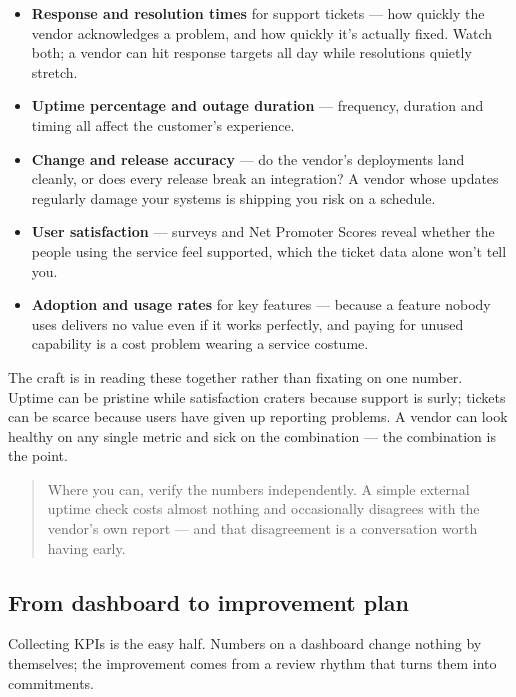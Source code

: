 \begin{itemize}[leftmargin=*]
\item \textbf{Response and resolution times} for support tickets — how quickly the vendor acknowledges a problem, and how quickly it's actually fixed. Watch both; a vendor can hit response targets all day while resolutions quietly stretch.
\item \textbf{Uptime percentage and outage duration} — frequency, duration and timing all affect the customer's experience.
\item \textbf{Change and release accuracy} — do the vendor's deployments land cleanly, or does every release break an integration? A vendor whose updates regularly damage your systems is shipping you risk on a schedule.
\item \textbf{User satisfaction} — surveys and Net Promoter Scores reveal whether the people using the service feel supported, which the ticket data alone won't tell you.
\item \textbf{Adoption and usage rates} for key features — because a feature nobody uses delivers no value even if it works perfectly, and paying for unused capability is a cost problem wearing a service costume.
\end{itemize}

The craft is in reading these together rather than fixating on one number. Uptime can be pristine while satisfaction craters because support is surly; tickets can be scarce because users have given up reporting problems. A vendor can look healthy on any single metric and sick on the combination — the combination is the point.



\begin{quote}\small
Where you can, verify the numbers independently. A simple external uptime check costs almost nothing and occasionally disagrees with the vendor's own report — and that disagreement is a conversation worth having early.
\end{quote}



\subsection{From dashboard to improvement plan}


Collecting KPIs is the easy half. Numbers on a dashboard change nothing by themselves; the improvement comes from a review rhythm that turns them into commitments.


